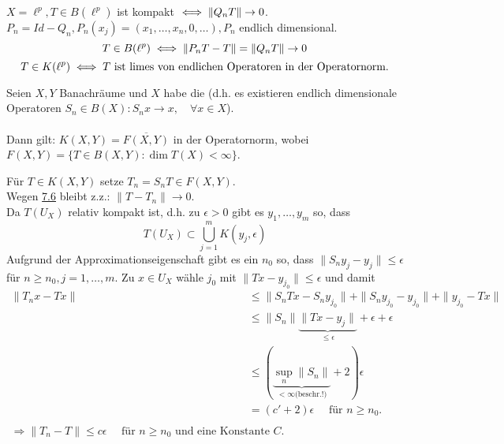 \begin{beispiel*}
	$X = \ell^{p}, T \in B(\ell^{p})$ ist kompakt $\iff \| Q_{n} T \| \rightarrow 0$. \\
	$P_{n} = Id - Q_{n}, P_{n}(x_{j}) = (x_{1}, \dotsc, x_{n}, 0, \dotsc), P_{n}$ endlich dimensional. \\
	\[ T \in B(\ell^{p}) \iff \| P_{n} T - T \| = \| Q_{n} T \| \rightarrow 0 \]
	\[ T \in K(\ell^{p}) \iff T \text{ ist limes von endlichen Operatoren in der Operatornorm.} \]
\end{beispiel*}


\begin{satz} \label{satz:7.7}
	Seien $X, Y$ Banachräume und $X$ habe die  (d.h. es existieren endlich dimensionale Operatoren $S_{n} \in B(X): S_{n} x \rightarrow x, \quad \forall x \in X$). \\ \\
	Dann gilt: $K(X, Y) = \overline{F(X, Y)}$ in der Operatornorm, wobei $F(X, Y) = \{ T \in B(X, Y): \dim T(X) < \infty \}$.
\end{satz}

\begin{beweis}
	Für $T \in K(X, Y)$ setze $T_{n} = S_{n} T \in F(X, Y)$. \\
	Wegen \hyperref[kor:7.6]{7.6} bleibt z.z.: $\| T - T_{n} \| \rightarrow 0$. \\
	Da $T(U_{X})$ relativ kompakt ist, d.h. zu $\epsilon > 0$ gibt es $y_{1}, \dotsc, y_{m}$ so, dass
	\[ T(U_{X}) \subset \bigcup_{j = 1}^{m} K(y_{j}, \epsilon) \]
	Aufgrund der Approximationseigenschaft gibt es ein $n_{0}$ so, dass  $\| S_{n} y_{j} - y_{j} \| \leq \epsilon$ für $n \geq n_{0}, j = 1, \dotsc, m$. Zu $x \in U_{X}$ wähle $j_{0}$ mit $\| Tx - y_{j_{0}} \| \leq \epsilon$ und damit
	\begin{align*}
		\| T_{n} x - T x \| & \leq \| S_{n} T x - S_{n} y_{j_{0}} \| + \| S_{n} y_{j_{0}} - y_{j_{0}} \| + \| y_{j_{0}}- Tx \| \\
			& \leq \| S_{n} \| \underbrace{\| T x - y_{j} \|}_{\leq \epsilon} + \epsilon + \epsilon \\
			& \leq \left( \underbrace{\sup_{n} \| S_{n} \|}_{< \infty \text{(beschr.!)}} + 2 \right) \epsilon \\
			& = \left( c' + 2 \right) \epsilon \quad \text{ für } n \geq n_{0}. \\ \\
			\Rightarrow \| T_{n} - T \| \leq c \epsilon \quad \text{ für } n \geq n_{0} \text{ und eine Konstante } C.
	\end{align*}
\end{beweis}



\newpage